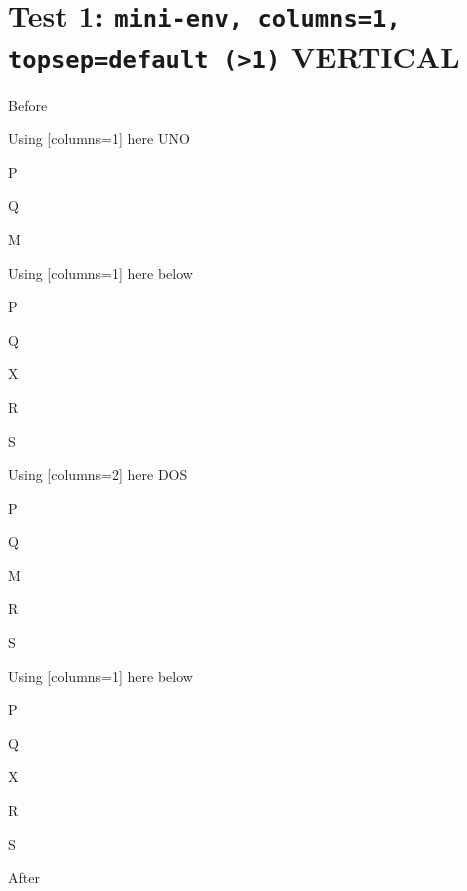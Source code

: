 \documentclass[12pt]{article}
\begin{document}
\section{Test 1: \texttt{mini-env, columns=1, topsep=default (>1)} VERTICAL}

Before
\begin{enumext}[columns=2]

\item Using [columns=1] here UNO

  \begin{enumext}[columns=1]%
     \item  P \item Q \item M%
  \end{enumext}

\item Using [columns=1] here below

\begin{enumext}[columns=1]%
     \item  P \item Q \item X  \item R \item S
  \end{enumext}

\columnbreak

\item Using [columns=2] here DOS

  \begin{enumext}[columns=2]%
    \item  P \item Q \item M \item R \item S
  \end{enumext}

\item Using [columns=1] here below

\begin{enumext}[columns=1]%
     \item  P \item Q \item X  \item R \item S
  \end{enumext}

\end{enumext}
After
\newpage
\end{document}
